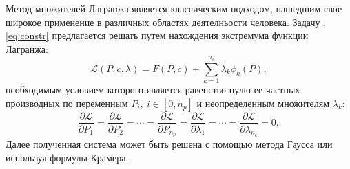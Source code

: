 %

Метод множителей Лагранжа является классическим подходом, нашедшим свое широкое применение в различных областях деятелньости человека. Задачу \label{track_fit}, \eqref{eq:constr} предлагается решать путем нахождения экстремума функции Лагранжа:
\begin{equation}
 \label{lagr}
 \mathcal{L}(P, c, \lambda) = F(P, c) + \sum_{k=1}^{n_c} \lambda_k \phi_k(P),
\end{equation}
необходимым условием которого является равенство нулю ее частных производных по переменным $P_i, ~i \in [0, n_p]$ и неопределенным множителям $\lambda_k$:
\[\frac{\partial \mathcal{L}}{\partial P_1} = \frac{\partial \mathcal{L}}{\partial P_2} = \cdots = \frac{\partial \mathcal{L}}{\partial P_{n_p}} = \frac{\partial \mathcal{L}}{\partial \lambda_1} = \cdots = \frac{\partial \mathcal{L}}{\partial \lambda_{n_c}} = 0,\]
Далее полученная система может быть решена с помощью метода Гаусса или используя формулы Крамера.
